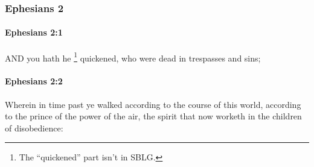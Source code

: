	\subsubsection{Ephesians 2} %
		\label{EPHESIANS-2}
		
		\paragraph{Ephesians 2:1} %
			\label{EPHESIANS-2-1}

			AND you hath he
				\footnote{%
					The ``quickened'' part isn't in SBLG.
					}%
			quickened, who were dead in trespasses and sins;

			\begin{framed}
			\scriptsize
				\begin{compactdesc}
					\item[SBLG] 
				\end{compactdesc}
			\end{framed}

		\paragraph{Ephesians 2:2} %
			\label{EPHESIANS-2-2}

			Wherein in time past ye walked according to the course of this world, according to the prince of the power of the air, the spirit that now worketh in the children of disobedience:

